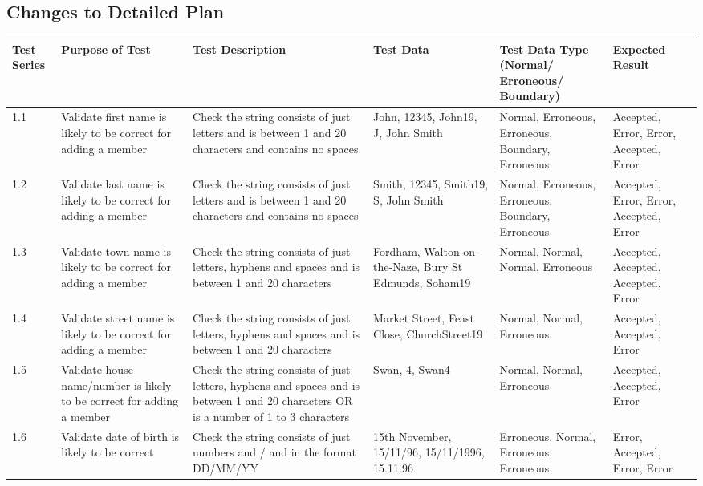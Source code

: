 \begin{landscape}
\begin{center}
\begin{longtable}{|p{1.5cm}|p{2.5cm}|p{2.5cm}|p{2cm}|p{2cm}|p{2cm}|}
    \end{longtable}
\end{center}


\subsection{Changes to Detailed Plan}

\begin{center}
    \begin{longtable}{|p{1.5cm}|p{2.5cm}|p{2.5cm}|p{2cm}|p{2cm}|p{2cm}|}
        \hline
        \textbf{Test Series} & \textbf{Purpose of Test} & \textbf{Test Description} & \textbf{Test Data} & \textbf{Test Data Type (Normal/ Erroneous/ Boundary)} & \textbf{Expected Result} \\ \hline
        1.1 & Validate first name is likely to be correct for adding a member & Check the string consists of just letters and is between 1 and 20 characters and contains no spaces & John, 12345, John19, J, John Smith & Normal, Erroneous, Erroneous, Boundary, Erroneous & Accepted, Error, Error, Accepted, Error \\ \hline
        1.2 & Validate last name is likely to be correct for adding a member & Check the string consists of just letters and is between 1 and 20 characters and contains no spaces & Smith, 12345, Smith19, S, John Smith & Normal, Erroneous, Erroneous, Boundary, Erroneous & Accepted, Error, Error, Accepted, Error \\ \hline
        1.3 & Validate town name is likely to be correct for adding a member & Check the string consists of just letters, hyphens and spaces and is between 1 and 20 characters & Fordham, Walton-on-the-Naze, Bury St Edmunds, Soham19 & Normal, Normal, Normal, Erroneous & Accepted, Accepted, Accepted, Error \\ \hline
        1.4 & Validate street name is likely to be correct for adding a member & Check the string consists of just letters, hyphens and spaces and is between 1 and 20 characters & Market Street, Feast Close, ChurchStreet19 & Normal, Normal, Erroneous & Accepted, Accepted, Error \\ \hline
        1.5 & Validate house name/number is likely to be correct for adding a member & Check the string consists of just letters, hyphens and spaces and is between 1 and 20 characters OR is a number of 1 to 3 characters & Swan, 4, Swan4 & Normal, Normal, Erroneous & Accepted, Accepted, Error \\ \hline
        \rowcolor{darkgrey} 1.6 & Validate date of birth is likely to be correct & Check the string consists of just numbers and / and in the format DD/MM/YY & 15th November, 15/11/96, 15/11/1996, 15.11.96 & Erroneous, Normal, Erroneous, Erroneous & Error, Accepted, Error, Error \\ \hline
        

\end{longtable}
\end{center}
\end{landscape}
